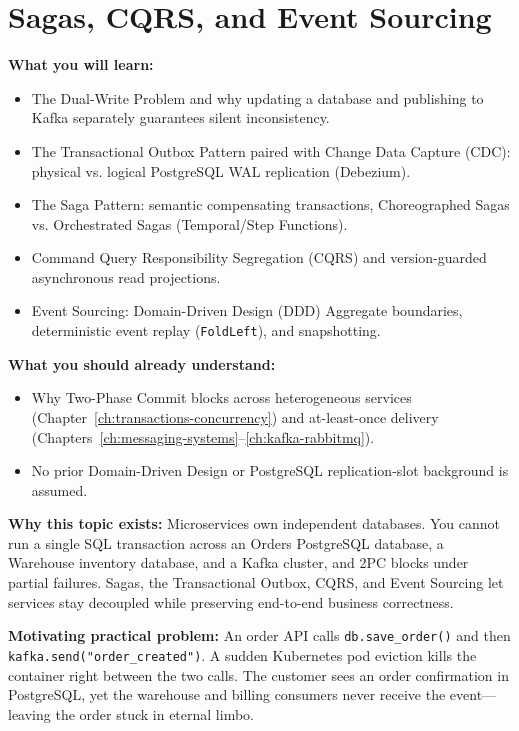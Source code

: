 \chapter{Sagas, CQRS, and Event Sourcing}
\label{ch:sagas-cqrs-eventsourcing}

\begin{chaptergoalsbox}
\textbf{What you will learn:}
\begin{itemize}[leftmargin=12pt]
  \item The Dual-Write Problem and why updating a database and publishing to Kafka separately guarantees silent inconsistency.
  \item The Transactional Outbox Pattern paired with Change Data Capture (CDC): physical vs. logical PostgreSQL WAL replication (Debezium).
  \item The Saga Pattern: semantic compensating transactions, Choreographed Sagas vs. Orchestrated Sagas (Temporal/Step Functions).
  \item Command Query Responsibility Segregation (CQRS) and version-guarded asynchronous read projections.
  \item Event Sourcing: Domain-Driven Design (DDD) Aggregate boundaries, deterministic event replay (\texttt{FoldLeft}), and snapshotting.
\end{itemize}

\textbf{What you should already understand:}
\begin{itemize}[leftmargin=12pt]
  \item Why Two-Phase Commit blocks across heterogeneous services (Chapter~\ref{ch:transactions-concurrency}) and at-least-once delivery (Chapters~\ref{ch:messaging-systems}--\ref{ch:kafka-rabbitmq}).
  \item No prior Domain-Driven Design or PostgreSQL replication-slot background is assumed.
\end{itemize}

\textbf{Why this topic exists:}
Microservices own independent databases. You cannot run a single SQL transaction across an Orders PostgreSQL database, a Warehouse inventory database, and a Kafka cluster, and 2PC blocks under partial failures. Sagas, the Transactional Outbox, CQRS, and Event Sourcing let services stay decoupled while preserving end-to-end business correctness.

\textbf{Motivating practical problem:}
An order API calls \texttt{db.save\_order()} and then \texttt{kafka.send("order\_created")}. A sudden Kubernetes pod eviction kills the container right between the two calls. The customer sees an order confirmation in PostgreSQL, yet the warehouse and billing consumers never receive the event---leaving the order stuck in eternal limbo.
\end{chaptergoalsbox}

